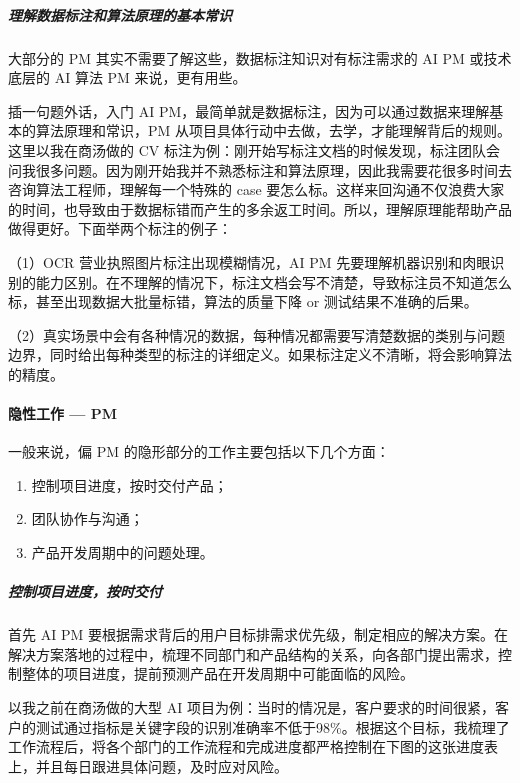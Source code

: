 \documentclass[letterpaper,10pt,english]{sphinxmanual}
\begin{document}
\subparagraph{理解数据标注和算法原理的基本常识}
\label{\detokenize{chapter_experience/recessive_work:id5}}
大部分的 PM 其实不需要了解这些，数据标注知识对有标注需求的 AI PM
或技术底层的 AI 算法 PM 来说，更有用些。

插一句题外话，入门 AI
PM，最简单就是数据标注，因为可以通过数据来理解基本的算法原理和常识，PM
从项目具体行动中去做，去学，才能理解背后的规则。 这里以我在商汤做的 CV
标注为例：刚开始写标注文档的时候发现，标注团队会问我很多问题。因为刚开始我并不熟悉标注和算法原理，因此我需要花很多时间去咨询算法工程师，理解每一个特殊的
case
要怎么标。这样来回沟通不仅浪费大家的时间，也导致由于数据标错而产生的多余返工时间。所以，理解原理能帮助产品做得更好。下面举两个标注的例子：

（1）OCR 营业执照图片标注出现模糊情况，AI PM
先要理解机器识别和肉眼识别的能力区别。在不理解的情况下，标注文档会写不清楚，导致标注员不知道怎么标，甚至出现数据大批量标错，算法的质量下降
or 测试结果不准确的后果。

（2）真实场景中会有各种情况的数据，每种情况都需要写清楚数据的类别与问题边界，同时给出每种类型的标注的详细定义。如果标注定义不清晰，将会影响算法的精度。


\paragraph{隐性工作 — PM}
\label{\detokenize{chapter_experience/recessive_work:pm}}
一般来说，偏 PM 的隐形部分的工作主要包括以下几个方面：
\begin{enumerate}
%
\item {} 
控制项目进度，按时交付产品；

\item {} 
团队协作与沟通；

\item {} 
产品开发周期中的问题处理。

\end{enumerate}


\subparagraph{控制项目进度，按时交付}
\label{\detokenize{chapter_experience/recessive_work:id6}}
首先 AI PM
要根据需求背后的用户目标排需求优先级，制定相应的解决方案。在解决方案落地的过程中，梳理不同部门和产品结构的关系，向各部门提出需求，控制整体的项目进度，提前预测产品在开发周期中可能面临的风险。

以我之前在商汤做的大型 AI
项目为例：当时的情况是，客户要求的时间很紧，客户的测试通过指标是关键字段的识别准确率不低于98\%。根据这个目标，我梳理了工作流程后，将各个部门的工作流程和完成进度都严格控制在下图的这张进度表上，并且每日跟进具体问题，及时应对风险。
\end{document}
